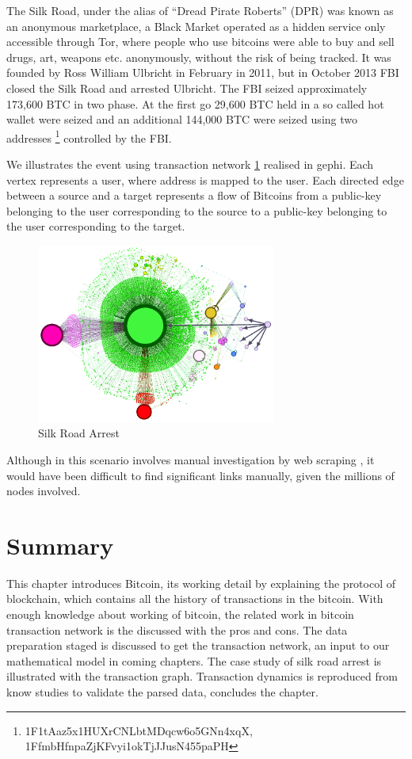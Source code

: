 The Silk Road, under the alias of “Dread Pirate Roberts” (DPR) was known as an anonymous marketplace, a Black Market operated as a hidden service only accessible through Tor, where people who use bitcoins were able to buy and sell drugs, art, weapons etc. anonymously, without the risk of being tracked. It was founded by Ross William Ulbricht in February in 2011, but in October 2013 FBI closed the Silk Road and arrested Ulbricht. The FBI  seized approximately 173,600 BTC in two phase. At the first go 29,600 BTC held in a so called hot wallet were seized and an additional 144,000 BTC were seized using two addresses \footnote{1F1tAaz5x1HUXrCNLbtMDqcw6o5GNn4xqX, 1FfmbHfnpaZjKFvyi1okTjJJusN455paPH} controlled by the FBI. 

We illustrates the event using transaction network \ref{fig:silk} realised in gephi. Each vertex represents a user, where address is mapped to the user. Each directed edge between a source and a target represents a flow of Bitcoins from a public-key belonging to the user corresponding to the source to a public-key belonging to the user corresponding to the target. 

\begin{figure}[ht]
\begin{center}
\includegraphics[width=0.7\textwidth]{./Figures/silk.png}
\caption{ Silk Road Arrest}
\label{fig:silk}
\end{center}
\end{figure}

Although in this scenario involves manual investigation by web scraping , it would have been difficult to find significant links manually, given the millions of nodes involved.

\section{Summary}
This chapter introduces Bitcoin, its working detail by explaining the protocol of blockchain, which contains all the history of transactions in the bitcoin. With enough knowledge about working of bitcoin, the related work in bitcoin transaction network is the discussed with the pros and cons. The data preparation staged is discussed to get the transaction network, an input to our mathematical model in coming chapters. The case study of silk road arrest is illustrated with the transaction graph. Transaction dynamics is reproduced from know studies to validate the parsed data, concludes the chapter.